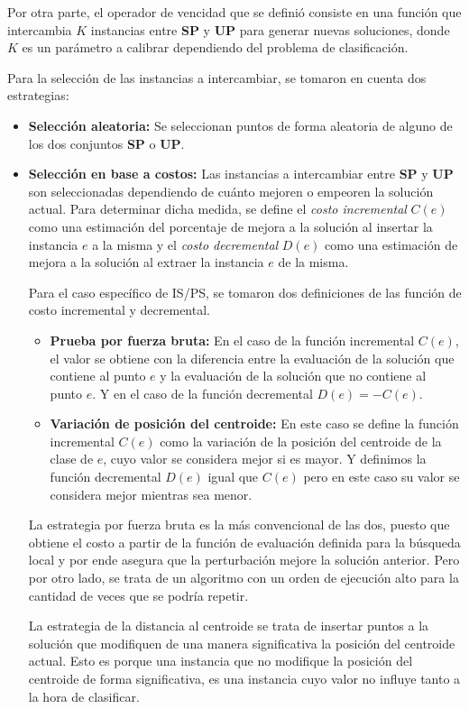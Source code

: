 \documentclass{ci5652}
\begin{document}
Por otra parte, el operador de vencidad que se definió consiste en una función que intercambia $K$ instancias entre \textbf{SP} y \textbf{UP} para generar nuevas soluciones, donde $K$ es un parámetro a calibrar dependiendo del problema de clasificación.

Para la selección de las instancias a intercambiar, se tomaron en cuenta dos estrategias:

\begin{itemize}
\item \textbf{Selección aleatoria:} Se seleccionan puntos de forma aleatoria de alguno de los dos conjuntos \textbf{SP} o \textbf{UP}.
\item \textbf{Selección en base a costos:} Las instancias a intercambiar entre \textbf{SP} y \textbf{UP} son seleccionadas dependiendo de cuánto mejoren o empeoren la solución actual. Para determinar dicha medida, se define el \textit{costo incremental} $C(e)$ como una estimación del porcentaje de mejora a la solución al insertar la instancia $e$ a la misma y el \textit{costo decremental} $D(e)$ como una estimación de mejora a la solución al extraer la instancia $e$ de la misma. 

Para el caso específico de IS/PS, se tomaron dos definiciones de las función de costo incremental y decremental. 

\begin{itemize}
\item \textbf{Prueba por fuerza bruta:} En el caso de la función incremental $C(e)$, el valor se obtiene con la diferencia entre la evaluación de la solución que contiene al punto $e$ y la evaluación de la solución que no contiene al punto $e$. Y en el caso de la función decremental $D(e) = -C(e)$.

\item \textbf{Variación de posición del centroide:} En este caso se define la función incremental $C(e)$ como la variación de la posición del centroide de la clase de $e$, cuyo valor se considera mejor si es mayor. Y definimos la función decremental $D(e)$ igual que $C(e)$ pero en este caso su valor se considera mejor mientras sea menor.

\end{itemize}

La estrategia por fuerza bruta es la más convencional de las dos, puesto que obtiene el costo a partir de la función de evaluación definida para la búsqueda local y por ende asegura que la perturbación mejore la solución anterior. Pero por otro lado, se trata de un algoritmo con un orden de ejecución alto para la cantidad de veces que se podría repetir.

La estrategia de la distancia al centroide se trata de insertar puntos a la solución que modifiquen de una manera significativa la posición del centroide actual. Esto es porque una instancia que no modifique la posición del centroide de forma significativa, es una instancia cuyo valor no influye tanto a la hora de clasificar.
\end{itemize}
\end{document}
